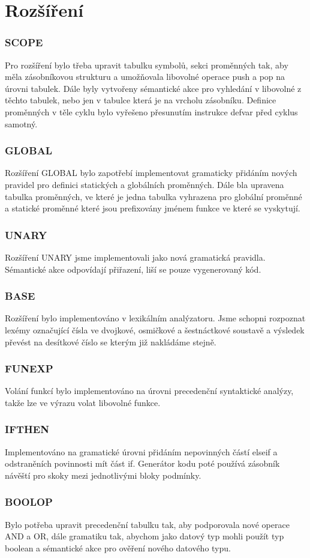 \section{Rozšíření}

\subsubsection{SCOPE}
Pro rozšíření bylo třeba upravit tabulku symbolů, sekci proměnných tak, aby
měla zásobníkovou strukturu a umožňovala libovolné operace push a pop na úrovni tabulek.
Dále byly vytvořeny sémantické akce pro vyhledání v libovolné z těchto tabulek,
nebo jen v tabulce která je na vrcholu zásobníku. Definice proměnných v těle cyklu
bylo vyřešeno přesunutím instrukce defvar před cyklus samotný.
\subsubsection{GLOBAL}
Rozšíření GLOBAL bylo zapotřebí implementovat gramaticky přidáním
nových pravidel pro definici statických a globálních proměnných.
Dále bla upravena tabulka proměnných, ve které je jedna tabulka vyhrazena
pro globální proměnné a statické proměnné které jsou prefixovány
jménem funkce ve které se vyskytují.
\subsubsection{UNARY}
Rozšíření UNARY jsme implementovali jako nová gramatická pravidla. Sémantické
akce odpovídají přiřazení, liší se pouze vygenerovaný kód.
\subsubsection{BASE}
Rozšíření bylo implementováno v lexikálním analýzatoru. Jsme schopni rozpoznat
lexémy označující čísla ve dvojkové, osmičkové a šestnáctkové soustavě a
výsledek převést na desítkové číslo se kterým již nakládáme stejně.
\subsubsection{FUNEXP}
Volání funkcí bylo implementováno na úrovni precedenční syntaktické analýzy,
takže lze ve výrazu volat libovolné funkce.
\subsubsection{IFTHEN}
Implementováno na gramatické úrovni přidáním nepovinných částí
elseif a odstraněních povinnosti mít část if. Generátor kodu poté používá zásobník návěští pro skoky mezi jednotlivými bloky podmínky.
\subsubsection{BOOLOP}
Bylo potřeba upravit precedenční tabulku tak, aby podporovala nové
operace AND a OR, dále gramatiku tak, abychom jako datový typ mohli
použít typ boolean a sémantické akce pro ověření nového datového typu.